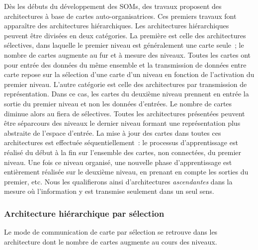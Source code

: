 \documentclass[../main]{subfiles}
\begin{document}
Dès les débuts du développement des SOMs, des travaux proposent des architectures à base de cartes auto-organisatrices. Ces premiers travaux font apparaître des architectures hiérarchiques. 
Les architectures hiérarchiques peuvent être divisées en deux catégories. La première est celle des architectures sélectives, dans laquelle le premier niveau est généralement une carte seule~; le nombre de cartes augmente au fur et à mesure des niveaux. Toutes les cartes ont pour entrée des données du même ensemble et la transmission de données entre carte repose sur la sélection d'une carte d'un niveau en fonction de l'activation du premier niveau. L'autre catégorie est celle des architectures par transmission de représentation. Dans ce cas, les cartes du deuxième niveau prennent en entrée la sortie du premier niveau et non les données d'entrées. Le nombre de cartes diminue alors au fiera de sélectives. 
Toutes les architectures présentées peuvent être séparcours des niveaux le dernier niveau formant une représentation plus abstraite de l'espace d'entrée.
La mise à jour des cartes dans toutes ces architectures est effectuée séquentiellement~: le processus d'apprentissage est réalisé du début à la fin sur l'ensemble des cartes, non connectées, du premier niveau. Une fois ce niveau organisé, une nouvelle phase d'apprentissage est entièrement réalisée sur le deuxième niveau, en prenant en compte les sorties du premier, etc. Nous les qualifierons ainsi d'architectures \emph{ascendantes} dans la mesure où l'information y est transmise seulement dans un seul sens.

\subsubsection{Architecture hiérarchique par sélection}

Le mode de communication de carte par sélection se retrouve dans les architecture dont le nombre de cartes augmente au cours des niveaux.
\end{document}
